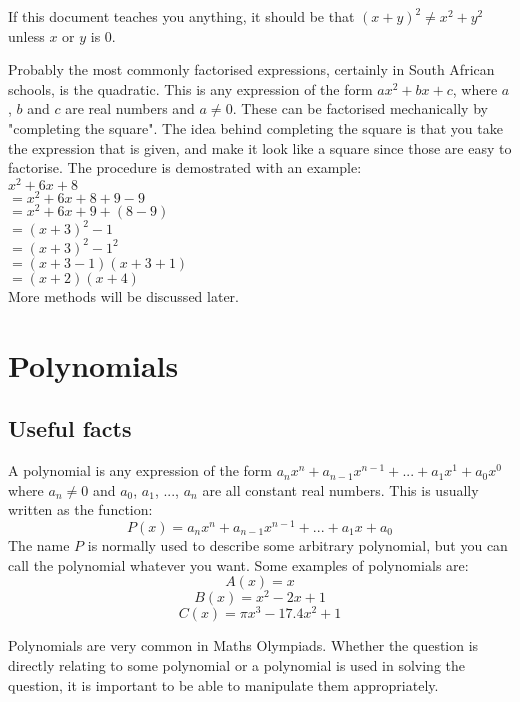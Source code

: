 \documentclass[a4paper,12pt]{article}
\begin{document}
If this document teaches you anything, it should be that $(x + y)^2 \neq x^2 + y^2$ unless $x$ or $y$ is 0.

Probably the most commonly factorised expressions, certainly in South African schools, is the quadratic. This is any expression of the form $ax^2 + bx + c$, where $a$, $b$ and $c$ are real numbers and $a \neq 0$. These can be factorised mechanically by "completing the square".  The idea behind completing the square is that you take the expression that is given, and make it look like a square since those are easy to factorise. The procedure is demostrated with an example: \\
$ x^2 + 6x + 8$ \\ 
$= x^2 + 6x + 8 + 9 - 9$ \\ 
$= x^2 + 6x + 9 + (8 - 9)$ \\
$= (x + 3)^2 - 1$ \\
$= (x + 3)^2 - 1^2$ \\
$= (x + 3 - 1)(x + 3 + 1)$ \\ 
$= (x + 2)(x + 4)$ \\

More methods will be discussed later.

\section{Polynomials}

\subsection{Useful facts}

A polynomial is any expression of the form $a_nx^n + a_{n - 1}x^{n - 1} + ... + a_1x^1 + a_0x^0$ where $a_n \neq 0$ and $a_0$, $a_1$, ..., $a_n$ are all constant real numbers. This is usually written as the function:
$$P(x) = a_nx^n + a_{n - 1}x^{n - 1} + ... + a_1x + a_0$$
The name $P$ is normally used to describe some arbitrary polynomial, but you can call the polynomial whatever you want. Some examples of polynomials are:
$$A(x) = x$$
$$B(x) = x^2 - 2x + 1$$
$$C(x) = \pi x^3 - 17.4x^2 + 1$$

Polynomials are very common in Maths Olympiads. Whether the question is directly relating to some polynomial or a polynomial is used in solving the question, it is important to be able to manipulate them appropriately. \\
\end{document}
